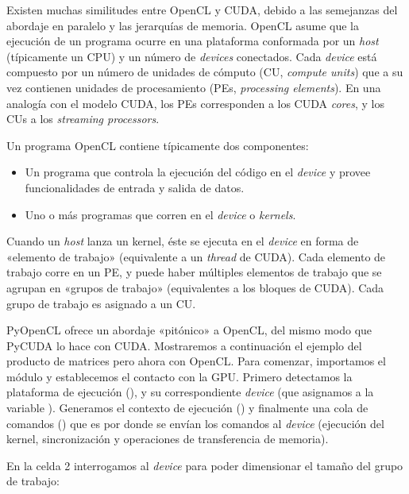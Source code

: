 Existen muchas similitudes entre OpenCL y CUDA, debido a las semejanzas del abordaje en paralelo y las jerarquías de memoria. OpenCL asume que la ejecución de un programa ocurre en una plataforma conformada por un \textit{host} (típicamente un CPU) y un número de \textit{devices} conectados. Cada \textit{device} está compuesto por un número de unidades de cómputo (CU, \textit{compute units}) que a su vez contienen unidades de procesamiento (PEs, \textit{processing elements}). En una analogía con el modelo CUDA, los PEs corresponden a los CUDA \textit{cores}, y los CUs a los \textit{streaming processors}.

Un programa OpenCL contiene típicamente dos componentes:
\begin{itemize}
  \item Un programa que controla la ejecución del código en el \textit{device} y provee funcionalidades de entrada y salida de datos.
    \item Uno o más programas que corren en el \textit{device} o \textit{kernels}.
\end{itemize}

Cuando un \textit{host} lanza un kernel, éste se ejecuta en el \textit{device} en forma de «elemento de trabajo» (equivalente a un \textit{thread} de CUDA). Cada elemento de trabajo corre en un PE, y puede haber múltiples elementos de trabajo que se agrupan en «grupos de trabajo» (equivalentes a los bloques de CUDA). Cada grupo de trabajo es asignado a un CU.

PyOpenCL ofrece un abordaje «pitónico» a OpenCL, del mismo modo que PyCUDA lo hace con CUDA. Mostraremos a continuación el ejemplo del producto de matrices pero ahora con OpenCL. Para comenzar, importamos el módulo  y establecemos el contacto con la GPU. Primero detectamos la plataforma de ejecución (), y su correspondiente \textit{device} (que asignamos a la variable ). Generamos el contexto de ejecución () y finalmente una cola de comandos () que es por donde se envían los comandos al \textit{device} (ejecución del kernel, sincronización y operaciones de transferencia de memoria).


En la celda 2 interrogamos al \textit{device} para poder dimensionar el tamaño del grupo de trabajo:


